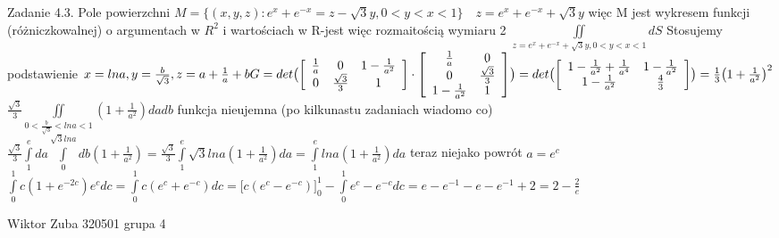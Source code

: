 \documentclass{article}
\begin{document}
Zadanie 4.3.
\newline
\newline
Pole powierzchni
$
M=\{(x,y,z):e^x+e^{-x}=z-\sqrt{3}y,0<y<x<1\}\quad
z=e^x+e^{-x}+\sqrt{3}y
$
 więc M jest wykresem funkcji (różniczkowalnej) o argumentach w $R^2$ i wartościach w R-jest więc rozmaitością wymiaru 2
$
\iint\limits_{z=e^x+e^{-x}+\sqrt{3}y,0<y<x<1}dS
$
 Stosujemy podstawienie 
$
x=ln{a},y=\frac{b}{\sqrt{3}},z=a+\frac{1}{a}+b\newline
G=det\bigl(
\left[\begin{array}{ccc}
\frac{1}{a}&0&1-\frac{1}{a^2}\\
0&\frac{\sqrt{3}}{3}&1
\end{array}\right]
\cdot
\left[\begin{array}{cc}
\frac{1}{a}&0\\
0&\frac{\sqrt{3}}{3}\\
1-\frac{1}{a^2}&1
\end{array}\right]
\bigr)
=
det\bigl(
\left[\begin{array}{cc}
1-\frac{1}{a^2}+\frac{1}{a^4}&1-\frac{1}{a^2}\\
1-\frac{1}{a^2}&\frac{4}{3}
\end{array}\right]
\bigr)
=
\frac{1}{3}\bigl(1+\frac{1}{a^2}\bigr)^2
$\newline
$
\frac{\sqrt{3}}{3}\iint\limits_{0<\frac{b}{\sqrt{3}}<ln{a}<1}(1+\frac{1}{a^2})dadb
$
funkcja nieujemna (po kilkunastu zadaniach wiadomo co)\newline
$
\frac{\sqrt{3}}{3}\int\limits_{1}^{e}da\int\limits_{0}^{\sqrt{3}ln{a}}db(1+\frac{1}{a^2})
=
\frac{\sqrt{3}}{3}\int\limits_{1}^{e}\sqrt{3}ln{a}(1+\frac{1}{a^2})da
=
\int\limits_{1}^{e}ln{a}(1+\frac{1}{a^2})da
$
teraz niejako powrót $a=e^c$
$
\int\limits_{0}^{1}c(1+e^{-2c})e^cdc
=
\int\limits_{0}^{1}c(e^c+e^{-c})dc
=
\bigl[c(e^c-e^{-c})\bigr]_{0}^{1}-\int\limits_{0}^{1}e^c-e^{-c}dc=e-e^{-1}-e-e^{-1}+2=2-\frac{2}{e}
$
\newpage

Wiktor Zuba 320501 grupa 4
\newline
\end{document}
